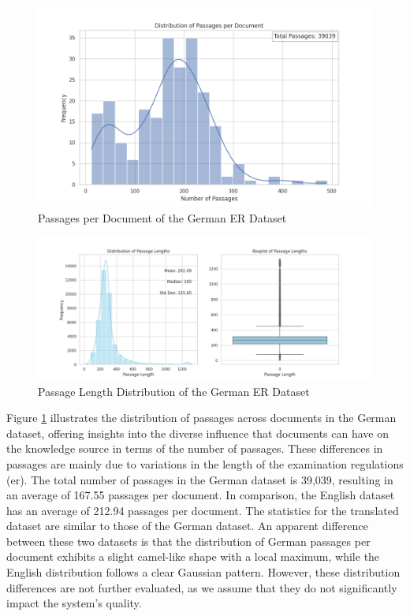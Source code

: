 \begin{figure}
    \centering
    \includegraphics[width=\textwidth]{Grafiken/Statistiken/IndexGerman_Passages_Distribution.png}
    \caption{Passages per Document of the German ER Dataset}
    \label{fig:er-german-passage-document}
\end{figure}

\begin{figure}
    \centering
    \includegraphics[width=\textwidth]{Grafiken/Statistiken/IndexGerman_Passage_Length_Statistics.png}
    \caption{Passage Length Distribution of the German ER Dataset}
    \label{fig:er-german-passage-length}
\end{figure}
Figure \ref{fig:er-german-passage-document} illustrates the distribution of passages across documents in the German dataset, offering insights into the diverse influence that documents can have on the knowledge source in terms of the number of passages. These differences in passages are mainly due to variations in the length of the examination regulations (\gls{er}). The total number of passages in the German dataset is 39,039, resulting in an average of 167.55 passages per document. In comparison, the English dataset has an average of 212.94 passages per document. The statistics for the translated dataset are similar to those of the German dataset. An apparent difference between these two datasets is that the distribution of German passages per document exhibits a slight camel-like shape with a local maximum, while the English distribution follows a clear Gaussian pattern. However, these distribution differences are not further evaluated, as we assume that they do not significantly impact the system's quality.

